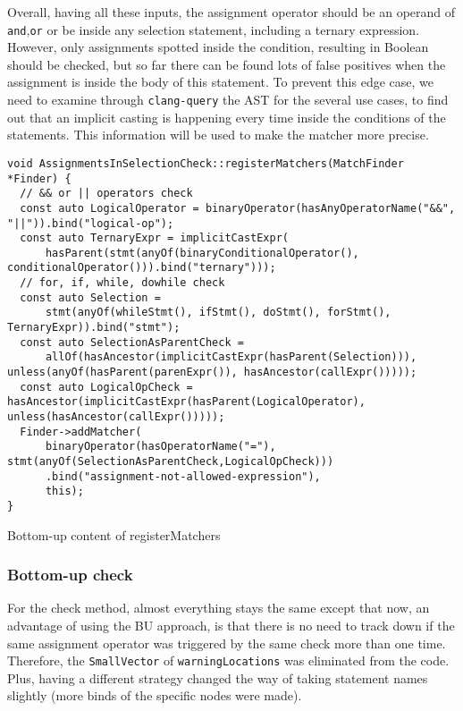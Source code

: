 Overall, having all these inputs, the assignment operator should be an operand of \lstinline{and},\lstinline{or} or be inside any selection statement, including a ternary expression. However, only assignments spotted inside the condition, resulting in Boolean should be checked, but so far there can be found lots of false positives when the assignment is inside the body of this statement. To prevent this edge case, we need to examine through \lstinline{clang-query} the AST for the several use cases, to find out that an implicit casting is happening every time inside the conditions of the statements. This information will be used to make the matcher more precise. 

\begin{listing}[H]
\begin{verbatim}
void AssignmentsInSelectionCheck::registerMatchers(MatchFinder *Finder) {
  // && or || operators check
  const auto LogicalOperator = binaryOperator(hasAnyOperatorName("&&", "||")).bind("logical-op");
  const auto TernaryExpr = implicitCastExpr(
      hasParent(stmt(anyOf(binaryConditionalOperator(), conditionalOperator())).bind("ternary")));
  // for, if, while, dowhile check
  const auto Selection =
      stmt(anyOf(whileStmt(), ifStmt(), doStmt(), forStmt(), TernaryExpr)).bind("stmt");
  const auto SelectionAsParentCheck =
      allOf(hasAncestor(implicitCastExpr(hasParent(Selection))), unless(anyOf(hasParent(parenExpr()), hasAncestor(callExpr()))));
  const auto LogicalOpCheck = hasAncestor(implicitCastExpr(hasParent(LogicalOperator), unless(hasAncestor(callExpr()))));
  Finder->addMatcher(
      binaryOperator(hasOperatorName("="), stmt(anyOf(SelectionAsParentCheck,LogicalOpCheck)))
      .bind("assignment-not-allowed-expression"),
      this);
}
\end{verbatim}
\caption{Bottom-up content of registerMatchers}
\end{listing}


\subsubsection{Bottom-up check}

For the check method, almost everything stays the same except that now, an advantage of using the BU approach, is that there is no need to track down if the same assignment operator was triggered by the same check more than one time. Therefore, the \lstinline{SmallVector} of \lstinline{warningLocations} was eliminated from the code. Plus, having a different strategy changed the way of taking statement names slightly (more binds of the specific nodes were made). 

